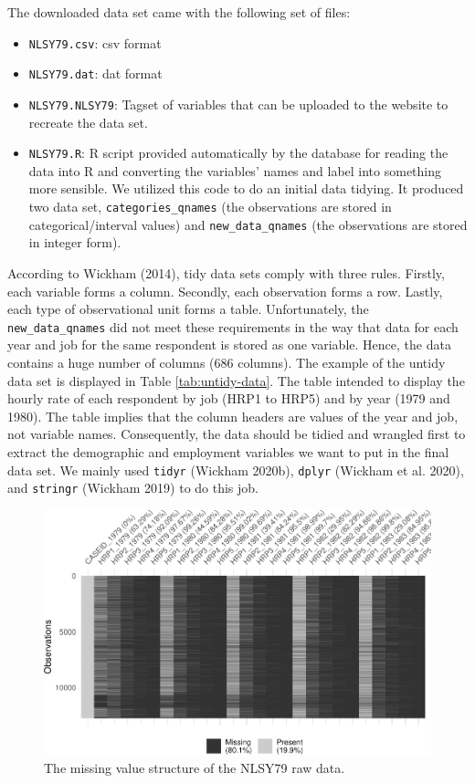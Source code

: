 \documentclass{article}
\begin{document}
The downloaded data set came with the following set of files:

\begin{itemize}
\tightlist
\item
  \texttt{NLSY79.csv}: csv format
\item
  \texttt{NLSY79.dat}: dat format
\item
  \texttt{NLSY79.NLSY79}: Tagset of variables that can be uploaded to the website to recreate the data set.
\item
  \texttt{NLSY79.R}: R script provided automatically by the database for reading the data into R and converting the variables' names and label into something more sensible. We utilized this code to do an initial data tidying. It produced two data set, \texttt{categories\_qnames} (the observations are stored in categorical/interval values) and \texttt{new\_data\_qnames} (the observations are stored in integer form).
\end{itemize}

According to Wickham (2014), tidy data sets comply with three rules. Firstly, each variable forms a column. Secondly, each observation forms a row. Lastly, each type of observational unit forms a table. Unfortunately, the \texttt{new\_data\_qnames} did not meet these requirements in the way that data for each year and job for the same respondent is stored as one variable. Hence, the data contains a huge number of columns (686 columns). The example of the untidy data set is displayed in Table \ref{tab:untidy-data}. The table intended to display the hourly rate of each respondent by job (HRP1 to HRP5) and by year (1979 and 1980). The table implies that the column headers are values of the year and job, not variable names. Consequently, the data should be tidied and wrangled first to extract the demographic and employment variables we want to put in the final data set. We mainly used \texttt{tidyr} (Wickham 2020b), \texttt{dplyr} (Wickham et al. 2020), and \texttt{stringr} (Wickham 2019) to do this job.

\begin{figure}

{\centering \includegraphics[width=468px]{figures/untidy-data-1} 

}

\caption{The missing value structure of the NLSY79 raw data.}\label{fig:untidy-data}
\end{figure}
\end{document}
